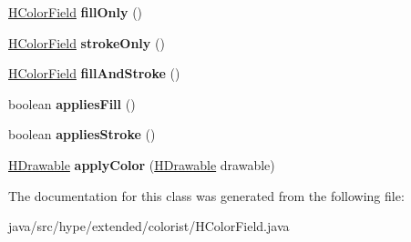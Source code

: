 \begin{DoxyCompactItemize}
\item 
\hypertarget{classhype_1_1extended_1_1colorist_1_1_h_color_field_a46dd7293d83566b7123aae2f84383012}{\hyperlink{classhype_1_1extended_1_1colorist_1_1_h_color_field}{H\-Color\-Field} {\bfseries fill\-Only} ()}\label{classhype_1_1extended_1_1colorist_1_1_h_color_field_a46dd7293d83566b7123aae2f84383012}

\item 
\hypertarget{classhype_1_1extended_1_1colorist_1_1_h_color_field_a7bd48b1c62b9a1de90d1c3b2cb912e94}{\hyperlink{classhype_1_1extended_1_1colorist_1_1_h_color_field}{H\-Color\-Field} {\bfseries stroke\-Only} ()}\label{classhype_1_1extended_1_1colorist_1_1_h_color_field_a7bd48b1c62b9a1de90d1c3b2cb912e94}

\item 
\hypertarget{classhype_1_1extended_1_1colorist_1_1_h_color_field_a701186574477d7290062bc2bc3cd8351}{\hyperlink{classhype_1_1extended_1_1colorist_1_1_h_color_field}{H\-Color\-Field} {\bfseries fill\-And\-Stroke} ()}\label{classhype_1_1extended_1_1colorist_1_1_h_color_field_a701186574477d7290062bc2bc3cd8351}

\item 
\hypertarget{classhype_1_1extended_1_1colorist_1_1_h_color_field_a85aa13702e152155208f993ffb2958a4}{boolean {\bfseries applies\-Fill} ()}\label{classhype_1_1extended_1_1colorist_1_1_h_color_field_a85aa13702e152155208f993ffb2958a4}

\item 
\hypertarget{classhype_1_1extended_1_1colorist_1_1_h_color_field_a667748a717650b285e8847be7228b056}{boolean {\bfseries applies\-Stroke} ()}\label{classhype_1_1extended_1_1colorist_1_1_h_color_field_a667748a717650b285e8847be7228b056}

\item 
\hypertarget{classhype_1_1extended_1_1colorist_1_1_h_color_field_a21b5b6495b5d5e462d3846eb97bef52e}{\hyperlink{classhype_1_1core_1_1drawable_1_1_h_drawable}{H\-Drawable} {\bfseries apply\-Color} (\hyperlink{classhype_1_1core_1_1drawable_1_1_h_drawable}{H\-Drawable} drawable)}\label{classhype_1_1extended_1_1colorist_1_1_h_color_field_a21b5b6495b5d5e462d3846eb97bef52e}

\end{DoxyCompactItemize}


The documentation for this class was generated from the following file\-:\begin{DoxyCompactItemize}
\item 
java/src/hype/extended/colorist/H\-Color\-Field.\-java\end{DoxyCompactItemize}
